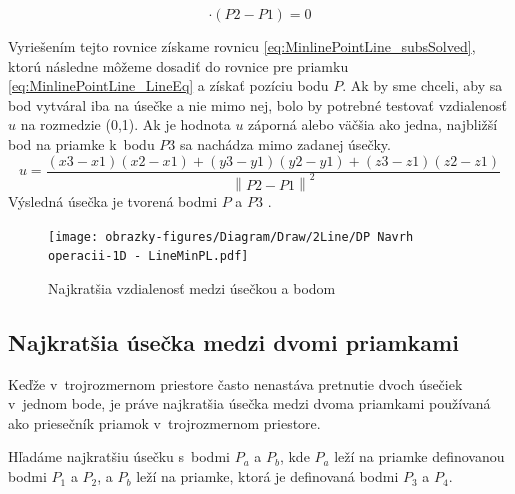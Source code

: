 \begin{equation}
[P3 - P1 - u(P2-P1)] \cdot (P2 - P1) = 0
    \label{eq:MinlinePointLine_subs}
\end{equation}

Vyriešením tejto rovnice získame rovnicu \ref{eq:MinlinePointLine_subsSolved}, ktorú následne môžeme dosadiť do rovnice pre priamku \ref{eq:MinlinePointLine_LineEq} a získať pozíciu bodu $P$. Ak by sme chceli, aby sa bod vytváral iba na úsečke a nie mimo nej, bolo by potrebné testovať vzdialenosť $u$ na rozmedzie (0,1). Ak je hodnota $u$ záporná alebo väčšia ako jedna,  najbližší bod na priamke k~bodu $P3$ sa nachádza mimo zadanej úsečky. 
\begin{equation}
u= \frac
{\left (x3 -x1  \right )\left (x2-x1  \right )
+\left (y3-y1  \right )\left (y2-y1  \right )
+\left (z3-z1  \right )\left (z2-z1  \right )}
{\left \| P2-P1 \right \|^{2}}
    \label{eq:MinlinePointLine_subsSolved}
\end{equation}
Výsledná úsečka je tvorená bodmi $P$ a $P3$ \cite{bourke_Point_Line_Plane}.



\begin{figure}[H]
	\centering
	\texttt{[image: obrazky-figures/Diagram/Draw/2Line/DP Navrh operacii-1D -  LineMinPL.pdf]}
	\caption{Najkratšia vzdialenosť medzi úsečkou a bodom}
	\label{fig:LineMinPL}
\end{figure}

\subsection*{Najkratšia úsečka medzi dvomi priamkami}
Keďže v~trojrozmernom priestore často nenastáva pretnutie dvoch úsečiek v~jednom bode, je práve najkratšia úsečka medzi dvoma priamkami používaná ako priesečník priamok v~trojrozmernom priestore.


Hľadáme najkratšiu úsečku s~bodmi $P_a$ a $P_b$, kde $P_a$ leží na priamke definovanou bodmi $P_1$ a $P_2$, a $P_b$ leží na priamke, ktorá je definovaná bodmi $P_3$ a $P_4$.

